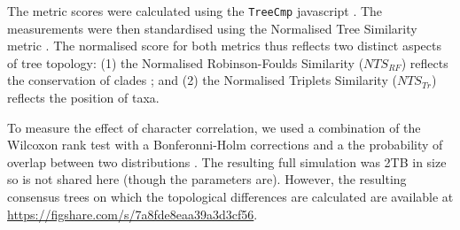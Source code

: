 \documentclass[12pt,letterpaper]{article}
\begin{document}
The metric scores were calculated using the \texttt{TreeCmp} javascript \citep{Bogdanowicz2012}.
The measurements were then standardised using the Normalised Tree Similarity metric \citep[$NTS$; centering and scaling the metric score to the number of taxa;][]{Bogdanowicz2012,Guillerme2016146}.
The normalised score for both metrics thus reflects two distinct aspects of tree topology: (1) the Normalised Robinson-Foulds Similarity ($NTS_{RF}$)  reflects the conservation of clades
; and (2) the Normalised Triplets Similarity ($NTS_{Tr}$) reflects the position of taxa.

To measure the effect of character correlation, we used a combination of the Wilcoxon rank test with a Bonferonni-Holm corrections \citep{holm1979simple} and a the probability of overlap between two distributions \citep[the Bhattacharyya Coefficient: $BC$;][]{Bhattacharyya}.
The resulting full simulation was 2TB in size so is not shared here (though the parameters are).
However, the resulting consensus trees on which the topological differences are calculated are available at \url{https://figshare.com/s/7a8fde8eaa39a3d3cf56}.
\end{document}
